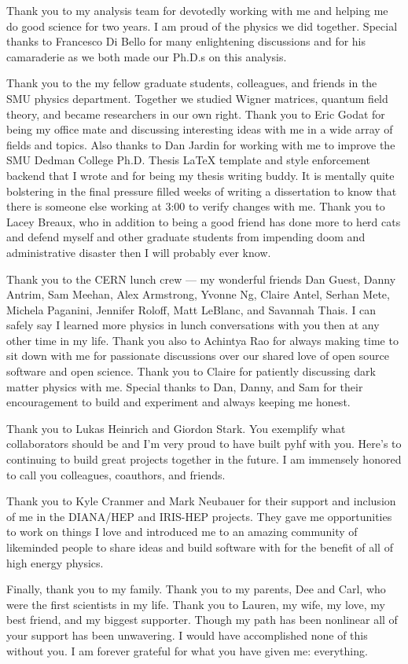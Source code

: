 Thank you to my analysis team for devotedly working with me and helping me do good science for two years.
I am proud of the physics we did together.
Special thanks to Francesco Di Bello for many enlightening discussions and for his camaraderie as we both made our Ph.D.s on this analysis.

Thank you to the my fellow graduate students, colleagues, and friends in the SMU physics department.
Together we studied Wigner matrices, quantum field theory, and became researchers in our own right.
Thank you to Eric Godat for being my office mate and discussing interesting ideas with me in a wide array of fields and topics.
Also thanks to Dan Jardin for working with me to improve the SMU Dedman College Ph.D. Thesis \LaTeX{} template and style enforcement backend that I wrote and for being my thesis writing buddy.
It is mentally quite bolstering in the final pressure filled weeks of writing a dissertation to know that there is someone else working at 3:00 to verify changes with me.
Thank you to Lacey Breaux, who in addition to being a good friend has done more to herd cats and defend myself and other graduate students from impending doom and administrative disaster then I will probably ever know.

Thank you to the CERN lunch crew --- my wonderful friends Dan Guest, Danny Antrim, Sam Meehan, Alex Armstrong, Yvonne Ng, Claire Antel, Serhan Mete, Michela Paganini, Jennifer Roloff, Matt LeBlanc, and Savannah Thais.
I can safely say I learned more physics in lunch conversations with you then at any other time in my life.
Thank you also to Achintya Rao for always making time to sit down with me for passionate discussions over our shared love of open source software and open science.
Thank you to Claire for patiently discussing dark matter physics with me.
Special thanks to Dan, Danny, and Sam for their encouragement to build and experiment and always keeping me honest.

Thank you to Lukas Heinrich and Giordon Stark.
You exemplify what collaborators should be and I'm very proud to have built pyhf with you.
Here's to continuing to build great projects together in the future.
I am immensely honored to call you colleagues, coauthors, and friends.

Thank you to Kyle Cranmer and Mark Neubauer for their support and inclusion of me in the DIANA/HEP and IRIS-HEP projects.
They gave me opportunities to work on things I love and introduced me to an amazing community of likeminded people to share ideas and build software with for the benefit of all of high energy physics.

Finally, thank you to my family.
Thank you to my parents, Dee and Carl, who were the first scientists in my life.
Thank you to Lauren, my wife, my love, my best friend, and my biggest supporter.
Though my path has been nonlinear all of your support has been unwavering.
I would have accomplished none of this without you.
I am forever grateful for what you have given me: everything.
